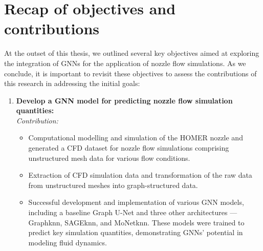 \section{Recap of objectives and contributions}
At the outset of this thesis, we outlined several key objectives aimed at exploring the integration of GNNs for the application of nozzle flow simulations. As we conclude, it is important to revisit these objectives to assess the contributions of this research in addressing the initial goals:
\begin{enumerate}
    \item \textbf{Develop a GNN model for predicting nozzle flow simulation quantities:} \\
    \textit{Contribution:}
    \begin{itemize}
        \item Computational modelling and simulation of the HOMER nozzle and generated a CFD dataset for nozzle flow simulations comprising unstructured mesh data for various flow conditions. 
        \item Extraction of CFD simulation data and transformation of the raw data from unstructured meshes into graph-structured data.
        \item Successful development and implementation of various GNN models, including a baseline Graph U-Net and three other architectures — Graphknn, SAGEknn, and MoNetknn. These models were trained to predict key simulation quantities, demonstrating GNNs' potential in modeling fluid dynamics.
    \end{itemize}
    

\end{enumerate}
